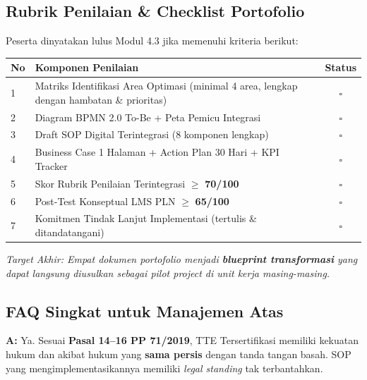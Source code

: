 \documentclass[11pt,a4paper]{article}
\begin{document}
\subsection{Rubrik Penilaian \& Checklist Portofolio}
Peserta dinyatakan lulus Modul 4.3 jika memenuhi kriteria berikut:

\begin{table}[h!]
\centering\small
\begin{tabularx}{\textwidth}{@{} l X c @{}}
\toprule
\textbf{No} & \textbf{Komponen Penilaian} & \textbf{Status} \\
\midrule
\rowcolor{plngreen!5}
1 & Matriks Identifikasi Area Optimasi (minimal 4 area, lengkap dengan hambatan \& prioritas) & $\square$ \\
2 & Diagram BPMN 2.0 To-Be + Peta Pemicu Integrasi & $\square$ \\
\rowcolor{plngreen!5}
3 & Draft SOP Digital Terintegrasi (8 komponen lengkap) & $\square$ \\
4 & Business Case 1 Halaman + Action Plan 30 Hari + KPI Tracker & $\square$ \\
\midrule
\rowcolor{plnorange!5}
5 & Skor Rubrik Penilaian Terintegrasi $\geq$ \textbf{70/100} & $\square$ \\
6 & Post-Test Konseptual LMS PLN $\geq$ \textbf{65/100} & $\square$ \\
7 & Komitmen Tindak Lanjut Implementasi (tertulis \& ditandatangani) & $\square$ \\
\bottomrule
\end{tabularx}
\end{table}

\textit{Target Akhir: Empat dokumen portofolio menjadi \textbf{blueprint transformasi} yang dapat langsung diusulkan sebagai pilot project di unit kerja masing-masing.}

\vspace{0.5cm}

\subsection{FAQ Singkat untuk Manajemen Atas}
\begin{faqbox}
\textbf{A:} Ya. Sesuai \textbf{Pasal 14--16 PP 71/2019}, TTE Tersertifikasi memiliki kekuatan hukum dan akibat hukum yang \textbf{sama persis} dengan tanda tangan basah. SOP yang mengimplementasikannya memiliki \textit{legal standing} tak terbantahkan.
\end{faqbox}
\end{document}
